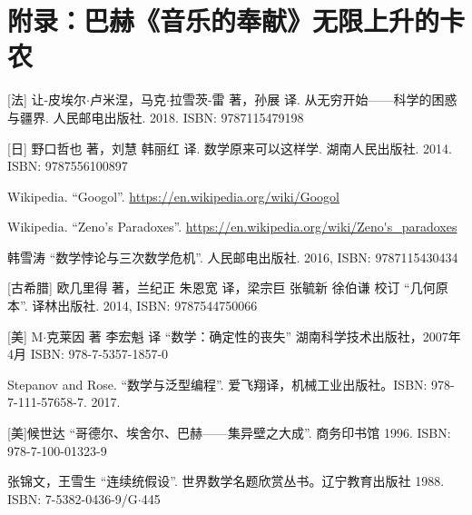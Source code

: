 \documentclass{article}
\begin{document}

\section{附录：巴赫《音乐的奉献》无限上升的卡农}



\ifx\wholebook\relax \else
\begin{thebibliography}{99}

[法] 让-皮埃尔$\cdot$卢米涅，马克$\cdot$拉雪茨-雷 著，孙展 译. 从无穷开始——科学的困惑与疆界. 人民邮电出版社. 2018. ISBN: 9787115479198

[日] 野口哲也 著，刘慧 韩丽红 译. 数学原来可以这样学. 湖南人民出版社. 2014. ISBN: 9787556100897

Wikipedia. ``Googol''. \url{https://en.wikipedia.org/wiki/Googol}

Wikipedia. ``Zeno's Paradoxes''. \url{https://en.wikipedia.org/wiki/Zeno's_paradoxes}

韩雪涛 ``数学悖论与三次数学危机''. 人民邮电出版社. 2016, ISBN: 9787115430434

[古希腊] 欧几里得 著，兰纪正 朱恩宽 译，梁宗巨 张毓新 徐伯谦 校订 ``几何原本''. 译林出版社. 2014, ISBN: 9787544750066

[美] M$\cdot$克莱因 著 李宏魁 译 ``数学：确定性的丧失'' 湖南科学技术出版社，2007年4月 ISBN: 978-7-5357-1857-0

Stepanov and Rose. ``数学与泛型编程''. 爱飞翔译，机械工业出版社。ISBN: 978-7-111-57658-7. 2017.

[美]候世达 ``哥德尔、埃舍尔、巴赫——集异壁之大成''. 商务印书馆 1996. ISBN: 978-7-100-01323-9

张锦文，王雪生 ``连续统假设''. 世界数学名题欣赏丛书。辽宁教育出版社 1988. ISBN: 7-5382-0436-9/G$\cdot$445

\end{thebibliography}

\expandafter\enddocument

\fi
\end{document}
